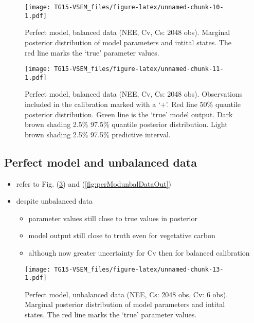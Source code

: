 \documentclass[]{article}
\providecommand{\tightlist}{%
  \setlength{\itemsep}{0pt}\setlength{\parskip}{0pt}}
\begin{document}
\begin{figure}
\centering
\texttt{[image: TG15-VSEM\_files/figure-latex/unnamed-chunk-10-1.pdf]}
\caption{\label{fig:perModbalDataPar}Perfect model, balanced data (NEE,
Cv, Cs: 2048 obs). Marginal posterior distribution of model parameters
and intital states. The red line marks the `true' parameter values.}
\end{figure}

\begin{figure}
\centering
\texttt{[image: TG15-VSEM\_files/figure-latex/unnamed-chunk-11-1.pdf]}
\caption{\label{fig:perModbalDataOut}Perfect model, balanced data (NEE,
Cv, Cs: 2048 obs). Observations included in the calibration marked with
a `+'. Red line 50\% quantile posterior distribution. Green line is the
`true' model output. Dark brown shading 2.5\% 97.5\% quantile posterior
distribution. Light brown shading 2.5\% 97.5\% predictive interval.}
\end{figure}

\subsection{Perfect model and unbalanced
data}\label{perfect-model-and-unbalanced-data}

\begin{itemize}
\tightlist
\item
  refer to Fig. (\ref{fig:perModunbalDataPar}) and
  (\ref{fig:perModunbalDataOut})
\item
  despite unbalanced data

  \begin{itemize}
  \tightlist
  \item
    parameter values still close to true values in posterior
  \item
    model output still close to truth even for vegetative carbon
  \item
    although now greater uncertainty for Cv then for balanced
    calibration
  \end{itemize}
\end{itemize}

\begin{figure}
\centering
\texttt{[image: TG15-VSEM\_files/figure-latex/unnamed-chunk-13-1.pdf]}
\caption{\label{fig:perModunbalDataPar}Perfect model, unbalanced data
(NEE, Cs: 2048 obs, Cv: 6 obs). Marginal posterior distribution of model
parameters and intital states. The red line marks the `true' parameter
values.}
\end{figure}
\end{document}
